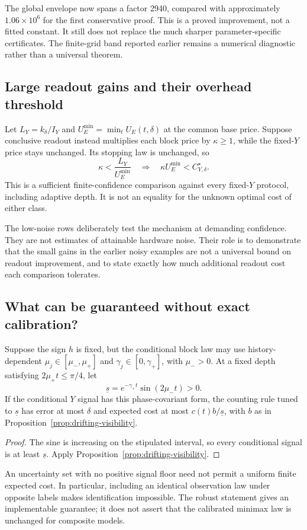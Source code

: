 The global envelope now spans a factor 2940, compared with approximately
$1.06\times10^6$ for the first conservative proof. This is a proved
improvement, not a fitted constant. It still does not replace the much
sharper parameter-specific certificates. The finite-grid band reported
earlier remains a numerical diagnostic rather than a universal theorem.

\subsection{Large readout gains and their overhead threshold}
Let $L_Y=k_\delta/I_Y$ and
$U_E^{\min}=\min_tU_E(t,\delta)$ at the common base price.
Suppose conclusive readout instead multiplies each block price by
$\kappa\geq1$, while the fixed-$Y$ price stays unchanged. Its stopping
law is unchanged, so
\begin{equation}\label{eq:readout-overhead-threshold}
 \kappa<\frac{L_Y}{U_E^{\min}}
 \quad\Longrightarrow\quad
 \kappa U_E^{\min}<C_{Y,\delta}^\star.
\end{equation}
This is a sufficient finite-confidence comparison against every
fixed-$Y$ protocol, including adaptive depth. It is not an equality
for the unknown optimal cost of either class.



The low-noise rows deliberately test the mechanism at demanding
confidence. They are not estimates of attainable hardware noise.
Their role is to demonstrate that the small gains in the earlier noisy
examples are not a universal bound on readout improvement, and to state
exactly how much additional readout cost each comparison tolerates.

\subsection{What can be guaranteed without exact calibration?}
\begin{corollary}
\label{cor:band-calibration}
Suppose the sign $h$ is fixed, but the conditional block law may use
history-dependent $\mu_j\in[\mu_-,\mu_+]$ and
$\gamma_j\in[0,\gamma_+]$, with $\mu_->0$.
At a fixed depth satisfying $2\mu_+t\leq\pi/4$, let
\[
 \underline s=e^{-\gamma_+t}\sin(2\mu_-t)>0.
\]
If the conditional $Y$ signal has this phase-covariant form, the counting
rule tuned to $\underline s$ has error at most $\delta$ and expected
cost at most $c(t)b/\underline s$, with $b$ as in
Proposition~\ref{prop:drifting-visibility}.
\end{corollary}
\begin{proof}
The sine is increasing on the stipulated interval, so every conditional
signal is at least $\underline s$. Apply
Proposition~\ref{prop:drifting-visibility}.
\end{proof}
An uncertainty set with no positive signal floor need not permit a
uniform finite expected cost. In particular, including an identical
observation law under opposite labels makes identification impossible.
The robust statement gives an implementable guarantee; it does not
assert that the calibrated minimax law is unchanged for composite models.

